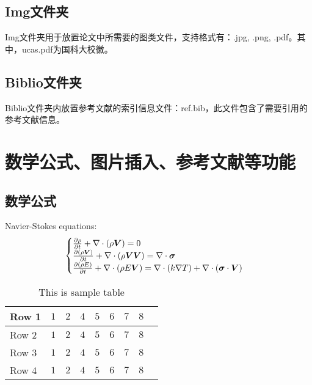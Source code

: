 \subsection{Img文件夹}

Img文件夹用于放置论文中所需要的图类文件，支持格式有：.jpg, .png, .pdf。其中，ucas.pdf为国科大校徽。

\subsection{Biblio文件夹}

Biblio文件夹内放置参考文献的索引信息文件：ref.bib，此文件包含了需要引用的参考文献信息。

\section{数学公式、图片插入、参考文献等功能}

\subsection{数学公式}

Navier-Stokes equations:
\begin{equation} \label{eq:ns}
    \begin{cases}
        \frac{\partial \rho}{\partial t} + \nabla\cdot(\rho\boldsymbol{V}) = 0 \\
        \frac{\partial (\rho\boldsymbol{V})}{\partial t} + \nabla\cdot(\rho\boldsymbol{V}\boldsymbol{V}) = \nabla\cdot\boldsymbol{\mathsf{\sigma}}\\
        \frac{\partial (\rho E)}{\partial t} + \nabla\cdot(\rho E\boldsymbol{V}) = \nabla\cdot(k\nabla T) + \nabla\cdot(\boldsymbol{\mathsf{\sigma}}\cdot\boldsymbol{V})
    \end{cases}
\end{equation}

\begin{table}[!htbp]
    \centering
    \renewcommand{\arraystretch}{1.2}
    \begin{tabular}{lcccccccc}
        \hline\hline
        Row 1 & $1$ & $2$ & $4$ & $5$ & $6$ & $7$ & $8$\\
        \hline
        Row 2 & $1$ & $2$ & $4$ & $5$ & $6$ & $7$ & $8$\\
        \hline
        Row 3 & $1$ & $2$ & $4$ & $5$ & $6$ & $7$ & $8$\\
        \hline
        Row 4 & $1$ & $2$ & $4$ & $5$ & $6$ & $7$ & $8$\\
        \hline\hline
    \end{tabular}
    \caption{This is sample table}
    \label{tab:sample}
\end{table}

